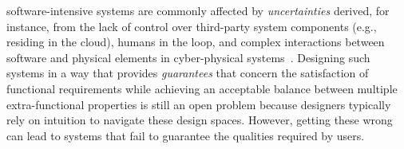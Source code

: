 \documentclass[10pt,journal,compsoc]{IEEEtran}
\begin{document}
% 
% 
% 
% 
 software-intensive systems are commonly affected by {\em uncertainties} derived, for instance, from the lack of control over third-party system components (e.g., residing in the cloud), humans in the loop, and complex interactions between software and physical elements in cyber-physical systems~\cite{DBLP:conf/sigsoft/Garlan10}.
 Designing such systems in a way that provides {\em guarantees} that concern the satisfaction of functional requirements while achieving an acceptable balance between multiple extra-functional properties is still an open problem because designers typically rely on intuition to navigate these design spaces.
 However, getting these wrong can lead to systems that fail to guarantee the qualities required by users.
\end{document}

